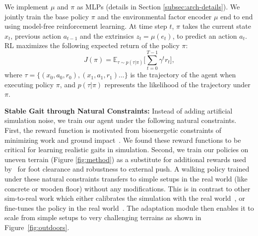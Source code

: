 \documentclass[conference]{IEEEtran}
\begin{document}
We implement $\mu$ and $\pi$ as MLPs (details in Section \ref{subsec:arch-details}). We jointly train the base policy $\pi$ and the environmental factor encoder $\mu$ end to end using model-free reinforcement learning. At time step $t$, $\pi$ takes the current state $x_t$, previous action $a_{t-1}$ and the extrinsics $z_t = \mu(e_t)$, to predict an action $a_t$. RL maximizes the following expected return of the policy $\pi$: 
\[
    J(\pi) = \mathbb{E}_{\tau \sim p(\tau|\pi)}\Bigg[\sum_{t=0}^{T-1}\gamma^t r_t\Bigg],
\]
where $\tau = \{(x_0, a_0, r_0), (x_1, a_1, r_1) . . .\}$ is the trajectory of the agent when executing policy $\pi$, and $p(\tau|\pi)$ represents the likelihood of the trajectory under $\pi$.

\vspace{0.6em}\noindent\textbf{Stable Gait through Natural Constraints:} Instead of adding artificial simulation noise, we train our agent under the following natural constraints. First, the reward function is motivated from bioenergetic constraints of minimizing work and ground impact~\cite{polet2019inelastic}. We found these reward functions to be critical for learning realistic gaits in simulation. Second, we train our policies on uneven terrain (Figure \ref{fig:method}) as a substitute for additional rewards used by~\cite{hwangbo2019learning} for foot clearance and robustness to external push. A walking policy trained under these natural constraints transfers to simple setups in the real world (like concrete or wooden floor) without any modifications. This is in contrast to other sim-to-real work which either calibrates the simulation with the real world~\cite{tan2018sim, hwangbo2019learning}, or fine-tunes the policy in the real world~\cite{peng2020learning}. The adaptation module then enables it to scale from simple setups to very challenging terrains as shown in Figure~\ref{fig:outdoors}.
\end{document}
